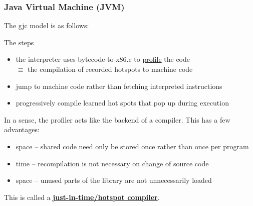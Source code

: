 \documentclass[../../lecture_notes.tex]{subfiles}
\begin{document}
\subsubsection*{Java Virtual Machine (JVM)}
The gjc model is as follows:\\
 \medskip
\noindent The steps \begin{itemize} [itemsep=0mm]
	\item the interpreter uses bytecode-to-x86.c to \underline{profile} the code\\
		$\equiv$ the compilation of recorded hotspots to machine code
	\item jump to machine code rather than fetching interpreted instructions
	\item progressively compile learned hot spots that pop up during execution
	\end{itemize}
In a sense, the profiler acts like the backend of a compiler.
This has a few advantages: \begin{itemize} [itemsep=0mm]
	\item space -- shared code need only be stored once rather than once per program
	\item time -- recompilation is not necessary on change of source code
	\item space -- unused parts of the library are not unnecessarily loaded
	\end{itemize}
This is called a \textbf{\underline{just-in-time/hotspot compiler}}.\\
\end{document}
